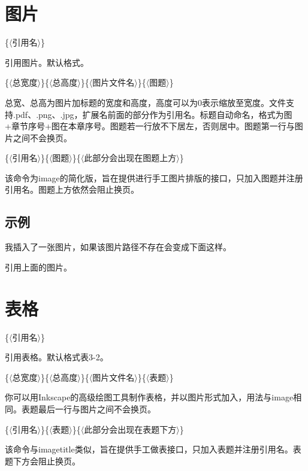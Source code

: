 \documentclass[a4paper]{article}
\begin{document}
	\section{图片}
	\begin{body}
		\{{\color{gray}$\langle$引用名$\rangle$}\}\par
		引用图片。默认格式{\gqq}。\par
		\{{\color{gray}$\langle$总宽度$\rangle$}\}\{{\color{gray}$\langle$总高度$\rangle$}\}\{{\color{gray}$\langle$图片文件名$\rangle$}\}\{{\color{gray}$\langle$图题$\rangle$}\}\par
		总宽、总高为图片加标题的宽度和高度，高度可以为0表示缩放至宽度。文件支持.pdf、.png、.jpg，扩展名前面的部分作为引用名。标题自动命名，格式为{\gqq}图+章节序号+图在本章序号{\cqq}。图题若一行放不下居左，否则居中。{图题第一行与图片之间不会换页。}\par
		\{{\color{gray}$\langle$引用名$\rangle$}\}\{{\color{gray}$\langle$图题$\rangle$}\}\{{\color{gray}$\langle$此部分会出现在图题上方$\rangle$}\}\par
		该命令为{\color{purple}\noindent{\bslash}image}的简化版，旨在提供进行手工图片排版的接口，只加入图题并注册引用名。{图题上方依然会阻止换页。}
	\end{body}
	\subsection{示例}
	\begin{body}
		我插入了一张图片，如果该图片路径不存在会变成下面这样\gqq{}\cqq。\par
		\image{\linewidth}{200pt}{img1.pdf}{测试图片}
		引用上面的图片\gqq{}\cqq。\par
	\end{body}
	\section{表格}
	\begin{body}
		\{{\color{gray}$\langle$引用名$\rangle$}\}\par
		引用表格。默认格式\gqq{}表3-2\cqq{}。\par
		\{{\color{gray}$\langle$总宽度$\rangle$}\}\{{\color{gray}$\langle$总高度$\rangle$}\}\{{\color{gray}$\langle$图片文件名$\rangle$}\}\{{\color{gray}$\langle$表题$\rangle$}\}\par
		你可以用Inkscape的高级绘图工具制作表格，并以图片形式加入，用法与{\color{purple}\noindent{\bslash}image}相同。{表题最后一行与图片之间不会换页。}\par
		\{{\color{gray}$\langle$引用名$\rangle$}\}\{{\color{gray}$\langle$表题$\rangle$}\}\{{\color{gray}$\langle$此部分会出现在表题下方$\rangle$}\}\par
		该命令与{\color{purple}\noindent{\bslash}imagetitle}类似，旨在提供手工做表接口，只加入表题并注册引用名。{表题下方会阻止换页。}\par
	\end{body}
\end{document}
